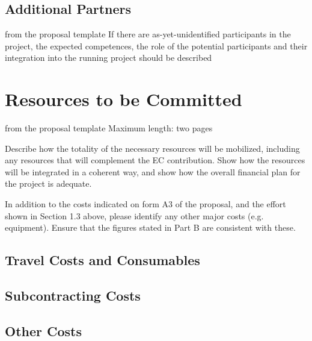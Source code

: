 \subsection{Additional Partners}\label{sec:assoc-partner}
\begin{todo}{from the proposal template}
  If there are as-yet-unidentified participants in the project, the expected competences,
  the role of the potential participants and their integration into the running project
  should be described
\end{todo}
\section{Resources to be Committed}\label{sec:resources}
\begin{todo}{from the proposal template}
Maximum length: two pages

Describe how the totality of the necessary resources will be mobilized, including any resources that
will complement the EC contribution. Show how the resources will be integrated in a coherent way,
and show how the overall financial plan for the project is adequate.

In addition to the costs indicated on form A3 of the proposal, and the effort shown in Section 1.3
above, please identify any other major costs (e.g. equipment). Ensure that the figures stated in Part B
are consistent with these.
\end{todo}

\subsection{Travel Costs and Consumables}\label{sec:travel-costs}
\subsection{Subcontracting Costs}
\subsection{Other Costs}


